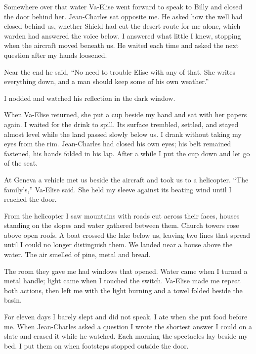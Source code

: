 Somewhere over that water Va-Elise went forward to speak to Billy and closed the door behind her. Jean-Charles sat opposite me. He asked how the well had closed behind us, whether Shield had cut the desert route for me alone, which warden had answered the voice below. I answered what little I knew, stopping when the aircraft moved beneath us. He waited each time and asked the next question after my hands loosened.\par

Near the end he said, ``No need to trouble Elise with any of that. She writes everything down, and a man should keep some of his own weather.''\par

I nodded and watched his reflection in the dark window.\par

When Va-Elise returned, she put a cup beside my hand and sat with her papers again. I waited for the drink to spill. Its surface trembled, settled, and stayed almost level while the land passed slowly below us. I drank without taking my eyes from the rim. Jean-Charles had closed his own eyes; his belt remained fastened, his hands folded in his lap. After a while I put the cup down and let go of the seat.\par

At Geneva a vehicle met us beside the aircraft and took us to a helicopter. ``The family's,'' Va-Elise said. She held my sleeve against its beating wind until I reached the door.\par

From the helicopter I saw mountains with roads cut across their faces, houses standing on the slopes and water gathered between them. Church towers rose above open roofs. A boat crossed the lake below us, leaving two lines that spread until I could no longer distinguish them. We landed near a house above the water. The air smelled of pine, metal and bread.\par

The room they gave me had windows that opened. Water came when I turned a metal handle; light came when I touched the switch. Va-Elise made me repeat both actions, then left me with the light burning and a towel folded beside the basin.\par

For eleven days I barely slept and did not speak. I ate when she put food before me. When Jean-Charles asked a question I wrote the shortest answer I could on a slate and erased it while he watched. Each morning the spectacles lay beside my bed. I put them on when footsteps stopped outside the door.\par


